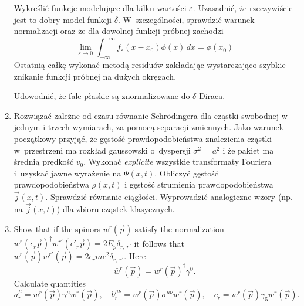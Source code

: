 \documentclass[a4paper,11pt]{article}
\begin{document}
\begin{enumerate}
  Wykreślić funkcje modelujące dla kilku wartości $\varepsilon$.
  Uzasadnić, że rzeczywiście jest to dobry model funkcji $\delta$.
  W~szczególności, sprawdzić warunek normalizacji oraz że dla dowolnej
  funkcji próbnej zachodzi
  \begin{equation}
    \label{QM:05}
    \lim_{ \varepsilon \to 0 } \int_{ -\infty }^{ +\infty } f_{ \varepsilon }( x - x_{ 0 } ) \phi( x ) \, dx
    =
    \phi( x_{ 0 } )
  \end{equation}
  Ostatnią całkę wykonać metodą residuów zakładając wystarczająco
  szybkie znikanie funkcji próbnej na dużych okręgach.

  Udowodnić, że fale płaskie są znormalizowane do $\delta$ Diraca.

\item Rozwiązać zależne od czasu równanie Schr\"{o}dingera dla cząstki
  swobodnej w jednym i trzech wymiarach, za pomocą separacji
  zmiennych. Jako warunek początkowy przyjąć, że gęstość
  prawdopodobieństwa znalezienia cząstki w~przestrzeni ma rozkład
  gaussowski o~dyspersji $\sigma^{ 2 } = a^{ 2 }$ i że pakiet ma
  średnią prędkość $v_{ 0 }$. Wykonać \textit{explicite} wszystkie
  transformaty Fouriera i~uzyskać jawne wyrażenie na $\Psi( x, t )$.
  Obliczyć gęstość prawdopodobieństwa $\rho( x, t )$ i gęstość
  strumienia prawdopodobieństwa $\vec{ j }( x, t )$. Sprawdzić
  równanie ciągłości. Wyprowadzić analogiczne wzory (np. na
  $\vec{ j }( x, t )$) dla zbioru cząstek klasycznych.

\item Show that if the spinors $w^{ r }( \vec{ p } )$ satisfy the
  normalization
  $w^{ r }( \epsilon_{ r } \vec{ p } )^{ \dagger } w^{ r' }(
  \epsilon'_{ r } \vec{ p } ) = 2 E_{ p } \delta_{ r, \, r' }$ it
  follows that
  $\bar{w}^{ r }( \vec{ p } ) w^{ r' }( \vec{ p } ) = 2 \epsilon_{ r }
  m c^{ 2 } \delta_{ r,\, r' }$. Here
  \begin{equation}
    \label{QM:06}
    \bar{w}^{ r }( \vec{ p } )
    = w^{ r }( \vec{ p } )^{ \dagger } \gamma^{ 0 }.
  \end{equation}
  Calculate quantities
  \begin{equation}
    \label{QM:07}
    a_{ r }^{ \mu }
    = \bar{w}^{ r }( \vec{ p } ) \gamma^{ \mu } w^{ r }( \vec{ p } ), \quad
    b_{ r }^{ \mu \nu }
    = \bar{w}^{ r }( \vec{ p } ) \sigma^{ \mu \nu } w^{ r }( \vec{ p } ), \quad
    c_{ r }
    = \bar{w}^{ r }( \vec{ p } ) \gamma_{ 5 } w^{ r }( \vec{ p } ).
  \end{equation}


\end{enumerate}
\end{document}
